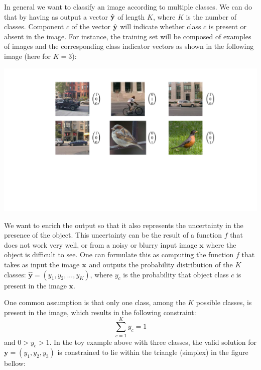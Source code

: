In general we want to classify an image according to multiple classes. We can do that by having as output a vector $\hat {\bf y}$ of length $K$, where $K$ is the number of classes. Component $c$ of the vector $\hat {\bf y}$ will indicate whether class $c$ is present or absent in the image. For instance, the training set will be composed of examples of images and the corresponding class indicator vectors as shown in the following image (here for $K=3$):

\includegraphics[width=1\linewidth]{figures/object_recognition/classification_training_set.pdf}

We want to enrich the output so that it also represents the uncertainty in the presence of the object. This uncertainty can be the result of a function $f$ that does not work very well, or from a noisy or blurry input image $\mathbf{x}$ where the object is difficult to see. One can formulate this as computing the function $f$ that takes as input the image ${\bf x}$ and outputs the probability distribution of the $K$ classes: $\hat{\mathbf{y}}=(y_1, y_2, ..., y_K)$, where $y_c$ is the probability that object class $c$ is present in the image $\mathbf{x}$. 

One common assumption is that only one class, among the $K$ possible classes, is present in the image, which results in the following constraint: 
\begin{equation}
\sum_{c=1}^K y_c=1
\end{equation}
and $0>y_c>1$.
In the toy example above with three classes, the valid solution for $\mathbf{y}=(y_1, y_2, y_3)$ is constrained to lie within the triangle (simplex) in the figure bellow:


